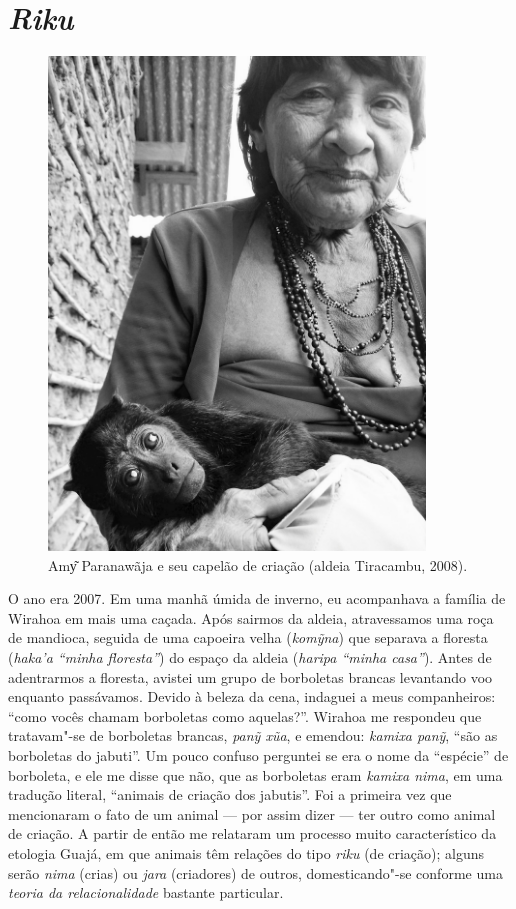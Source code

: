 
\chapter{\emph{Riku}}\label{riku}

\begin{figure}[H]
\centering
  \includegraphics[width=100mm]{./imgs/100_3892}
\caption{Amy͂ Paranawãja e seu capelão de criação (aldeia Tiracambu, 2008).}
\end{figure}

\noindent O ano era 2007. Em uma manhã úmida de inverno, eu acompanhava a família
de Wirahoa em mais uma caçada. Após sairmos da aldeia, atravessamos uma
roça de mandioca, seguida de uma capoeira velha (\emph{komỹna}) que
separava a floresta (\emph{haka'a ``minha floresta''}) do espaço da
aldeia (\emph{haripa ``minha casa''}). Antes de adentrarmos a floresta,
avistei um grupo de borboletas brancas levantando voo enquanto
passávamos. Devido à beleza da cena, indaguei a meus companheiros: ``como
vocês chamam borboletas como aquelas?''. Wirahoa me respondeu que
tratavam"-se de borboletas brancas, \emph{panỹ xũa}, e emendou:
\emph{kamixa panỹ}, ``são as borboletas do jabuti''. Um pouco confuso
perguntei se era o nome da ``espécie'' de borboleta, e ele me disse que
não, que as borboletas eram \emph{kamixa nima}, em uma tradução literal,
``animais de criação dos jabutis''. Foi a primeira vez que mencionaram o
fato de um animal --- por assim dizer --- ter outro como animal de criação.
A partir de então me relataram um processo muito característico da
etologia Guajá, em que animais têm relações do tipo \emph{riku} (de
criação); alguns serão \emph{nima} (crias) ou \emph{jara} (criadores) de
outros, domesticando"-se conforme uma \emph{teoria da relacionalidade}
bastante particular.

